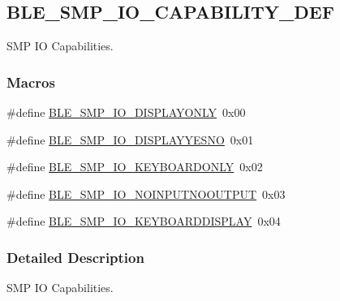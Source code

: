 \hypertarget{group___b_l_e___s_m_p___i_o___c_a_p_a_b_i_l_i_t_y___d_e_f}{}\subsection{B\+L\+E\+\_\+\+S\+M\+P\+\_\+\+I\+O\+\_\+\+C\+A\+P\+A\+B\+I\+L\+I\+T\+Y\+\_\+\+D\+EF}
\label{group___b_l_e___s_m_p___i_o___c_a_p_a_b_i_l_i_t_y___d_e_f}


S\+MP IO Capabilities.  


\subsubsection*{Macros}
\begin{DoxyCompactItemize}
\item 
\#define \hyperlink{group___b_l_e___s_m_p___i_o___c_a_p_a_b_i_l_i_t_y___d_e_f_ga4f6d0ab753817695b629722a4f7d9db0}{B\+L\+E\+\_\+\+S\+M\+P\+\_\+\+I\+O\+\_\+\+D\+I\+S\+P\+L\+A\+Y\+O\+N\+LY}~0x00
\item 
\#define \hyperlink{group___b_l_e___s_m_p___i_o___c_a_p_a_b_i_l_i_t_y___d_e_f_ga1b94356cc37f5aeced1b78cf8275fb13}{B\+L\+E\+\_\+\+S\+M\+P\+\_\+\+I\+O\+\_\+\+D\+I\+S\+P\+L\+A\+Y\+Y\+E\+S\+NO}~0x01
\item 
\#define \hyperlink{group___b_l_e___s_m_p___i_o___c_a_p_a_b_i_l_i_t_y___d_e_f_gaa0b8abfa8022f1fe77d3229fe60fd484}{B\+L\+E\+\_\+\+S\+M\+P\+\_\+\+I\+O\+\_\+\+K\+E\+Y\+B\+O\+A\+R\+D\+O\+N\+LY}~0x02
\item 
\#define \hyperlink{group___b_l_e___s_m_p___i_o___c_a_p_a_b_i_l_i_t_y___d_e_f_ga804bf60a8dc42605986a87f5d980d064}{B\+L\+E\+\_\+\+S\+M\+P\+\_\+\+I\+O\+\_\+\+N\+O\+I\+N\+P\+U\+T\+N\+O\+O\+U\+T\+P\+UT}~0x03
\item 
\#define \hyperlink{group___b_l_e___s_m_p___i_o___c_a_p_a_b_i_l_i_t_y___d_e_f_gab93287cc4a736e9b118b78575d843f50}{B\+L\+E\+\_\+\+S\+M\+P\+\_\+\+I\+O\+\_\+\+K\+E\+Y\+B\+O\+A\+R\+D\+D\+I\+S\+P\+L\+AY}~0x04
\end{DoxyCompactItemize}


\subsubsection{Detailed Description}
S\+MP IO Capabilities. 



